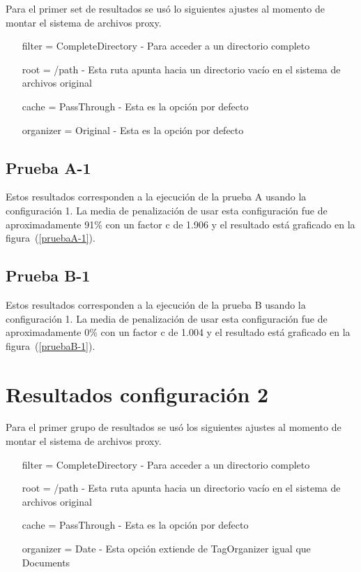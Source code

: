 Para el primer set de resultados se usó lo siguientes ajustes al momento de montar el sistema de archivos proxy.

\begin{itemize}
\item[filter] = CompleteDirectory - Para acceder a un directorio completo
\item[root] = /path - Esta ruta apunta hacia un directorio vacío en el sistema de archivos original
\item[cache] = PassThrough - Esta es la opción por defecto
\item[organizer] = Original - Esta es la opción por defecto
\end{itemize}

\subsection{Prueba A-1}

Estos resultados corresponden a la ejecución de la prueba A usando la configuración 1. La media de penalización de usar esta configuración fue de aproximadamente 91\% con un factor c de 1.906 y el resultado está graficado en la figura~(\ref{pruebaA-1}).


\subsection{Prueba B-1}

Estos resultados corresponden a la ejecución de la prueba B usando la configuración 1. La media de penalización de usar esta configuración fue de aproximadamente 0\% con un factor c de 1.004 y el resultado está graficado en la figura~(\ref{pruebaB-1}).



\section{Resultados configuración 2}

Para el primer grupo de resultados se usó los siguientes ajustes al momento de montar el sistema de archivos proxy.

\begin{itemize}
\item[filter] = CompleteDirectory - Para acceder a un directorio completo
\item[root] = /path - Esta ruta apunta hacia un directorio vacío en el sistema de archivos original
\item[cache] = PassThrough - Esta es la opción por defecto
\item[organizer] = Date - Esta opción extiende de TagOrganizer igual que Documents
\end{itemize}

